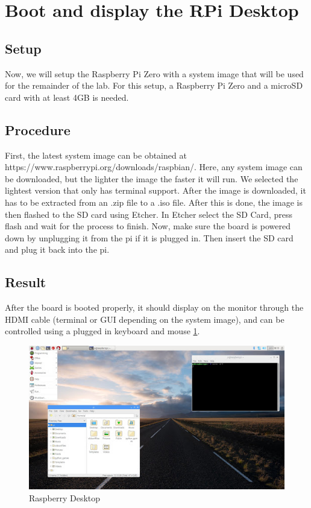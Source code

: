 \documentclass{article}
\begin{document}
	\section{Boot and display the RPi Desktop}
	\subsection{Setup}
	Now, we will setup the Raspberry Pi Zero with a system image that will be used for the remainder of the lab. For this setup, a Raspberry Pi Zero and a microSD card with at least 4GB is needed.
	
	\subsection{Procedure}
	First, the latest system image can be obtained at https://www.raspberrypi.org/downloads/raspbian/. Here, any system image can be downloaded, but the lighter the image the faster it will run. We selected the lightest version that only has terminal support. After the image is downloaded, it has to be extracted from an .zip file to a .iso file. After this is done, the image is then flashed to the SD card using Etcher. In Etcher select the SD Card, press flash and wait for the process to finish. Now, make sure the board is powered down by unplugging it from the pi if it is plugged in. Then insert the SD card and plug it back into the pi.
	
	\subsection{Result}
	After the board is booted properly, it should display on the monitor through the HDMI cable (terminal or GUI depending on the system image), and can be controlled using a plugged in keyboard and mouse \ref{RBD}. 
	\begin{figure}[hb]
		\includegraphics[width=\textwidth]{img/Lab2_RBP_DP.jpg}
		\caption{Raspberry Desktop} 
		\label{RBD}
	\end{figure}
	\clearpage
\end{document}
